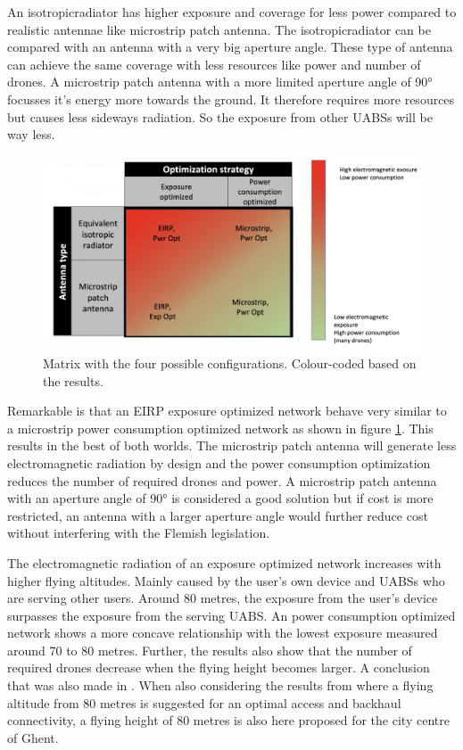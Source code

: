 An \gls{isotropicradiator} has higher exposure and coverage for less power compared to realistic antennae like microstrip patch antenna.
The \gls{isotropicradiator} can be compared with an antenna with a very big aperture angle.
These type of antenna can achieve the same coverage with less
resources like power and number of drones. 
A microstrip patch antenna  with a more limited aperture angle of \ang{90} focusses it's energy more towards the ground.
It therefore requires more resources but 
causes less sideways radiation. So the exposure from other \gls{UABS}s will be way less.

\begin{figure}[hb!]
  \includegraphics[width=\textwidth]{../images/fourCasesMatrixSol.png}
  \caption{Matrix with the four possible configurations. Colour-coded based on the results.}
  \label{fig:resultIllustration}
\end{figure}

Remarkable is that an \gls{EIRP} exposure optimized network behave very similar to a microstrip power consumption optimized network as shown 
in figure \ref{fig:resultIllustration}.
This results in the best of both worlds. 
The microstrip patch antenna will generate less electromagnetic radiation by design and
 the power consumption optimization reduces the number of required drones and power. A microstrip patch antenna with an aperture 
 angle of \ang{90} is considered a good solution but if cost is more restricted, an antenna with a larger aperture angle 
 would further reduce cost without interfering with the Flemish legislation.

The electromagnetic radiation of an exposure optimized network increases with higher flying altitudes. Mainly caused by the user's 
own device and \gls{UABS}s who are serving other users. Around 80 metres, the exposure from the  user's device surpasses the exposure from the serving \gls{UABS}.
An power consumption optimized network shows a more concave relationship with the lowest exposure measured around 70 to 80 metres.
Further, the results also show that the number of required drones decrease when the flying height becomes larger. A conclusion that was also made in \cite{J2}.
 When also considering the results from \cite{J27_backhaul} where a flying altitude from 
80 metres is suggested for an optimal access and backhaul connectivity, a flying height 
of 80 metres is also here proposed for the city centre of Ghent.

